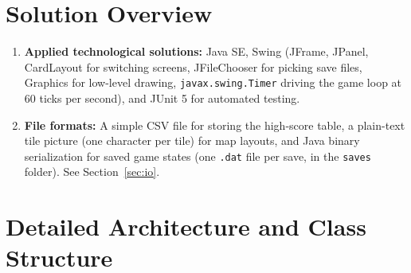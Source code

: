 \documentclass[11pt, a4paper]{article}
\begin{document}
\section{Solution Overview}
\begin{enumerate}
    \item \textbf{Applied technological solutions:} Java SE, Swing (JFrame, JPanel, CardLayout for switching screens, JFileChooser for picking save files, Graphics for low-level drawing, \texttt{javax.swing.Timer} driving the game loop at 60 ticks per second), and JUnit 5 for automated testing.
    \item \textbf{File formats:} A simple CSV file for storing the high-score table, a plain-text tile picture (one character per tile) for map layouts, and Java binary serialization for saved game states (one \texttt{.dat} file per save, in the \texttt{saves} folder). See Section~\ref{sec:io}.
\end{enumerate}

\clearpage

\section{Detailed Architecture and Class Structure}
\end{document}

